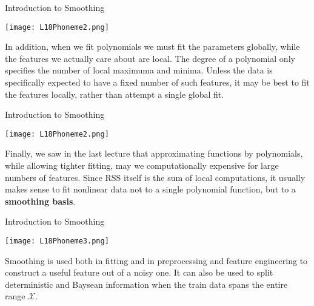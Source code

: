 \documentclass[10pt, table, dvipsnames,xcdraw,handout]{beamer}
\begin{document}
\begin{frame}[fragile]{Introduction to Smoothing}
  \begin{minipage}[t][0.5\textheight][t]{\textwidth}
	\centering \texttt{[image: L18Phoneme2.png]} 
  \end{minipage}
  \vfill
\begin{minipage}[t][0.5\textheight][t]{\textwidth}
In addition, when we fit polynomials we must fit the parameters globally, while the features we actually care about are local. The degree of a polynomial only specifies the number of local maximuma and minima. Unless the data is specifically expected to have a fixed number of such features, it may be best to fit the features locally, rather than attempt a single global fit. 
\end{minipage}
\end{frame}




\begin{frame}[fragile]{Introduction to Smoothing}
  \begin{minipage}[t][0.5\textheight][t]{\textwidth}
	\centering \texttt{[image: L18Phoneme2.png]} 
  \end{minipage}
  \vfill
\begin{minipage}[t][0.5\textheight][t]{\textwidth}
Finally, we saw in the last lecture that approximating functions by polynomials, while allowing tighter fitting, may we computationally expensive for large numbers of features. Since RSS itself is the sum of local computations, it usually makes sense to fit nonlinear data not to a single polynomial function, but to a \textbf{smoothing basis}. 
\end{minipage}
\end{frame}








\begin{frame}[fragile]{Introduction to Smoothing}
  \begin{minipage}[t][0.5\textheight][t]{\textwidth}
	\centering \texttt{[image: L18Phoneme3.png]} 
  \end{minipage}
  \vfill
\begin{minipage}[t][0.5\textheight][t]{\textwidth}
Smoothing is used both in fitting and in preprocessing and feature engineering to construct a useful feature out of a noisy one. \pause It can also be used to split deterministic and Baysean information when the train data spans the entire range $\mathcal{X}$.
\end{minipage}
\end{frame}
\end{document}
